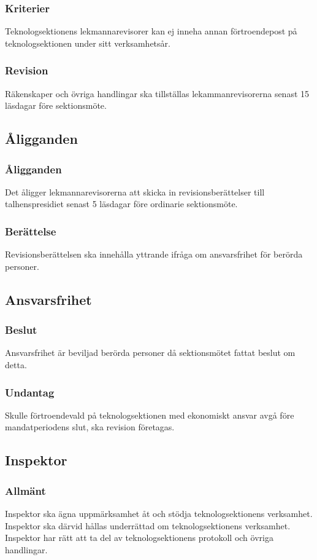 \documentclass[a4paper]{dtek}
\begin{document}
\subsubsection{Kriterier}
Teknologsektionens lekmannarevisorer kan ej inneha annan förtroendepost på teknologsektionen under sitt verksamhetsår.
\subsubsection{Revision}
Räkenskaper och övriga handlingar ska tillställas lekammanrevisorerna senast 15 läsdagar före sektionsmöte.
\subsection{Åligganden}
\subsubsection{Åligganden}
Det åligger lekmannarevisorerna att skicka in revisionsberättelser till talhenspresidiet senast 5 läsdagar före ordinarie sektionsmöte.
\subsubsection{Berättelse}
Revisionsberättelsen ska innehålla yttrande ifråga om ansvarsfrihet för berörda personer.
\subsection{Ansvarsfrihet}
\subsubsection{Beslut}
Ansvarsfrihet är beviljad berörda personer då sektionsmötet fattat beslut om detta.
\subsubsection{Undantag}
Skulle förtroendevald på teknologsektionen med ekonomiskt ansvar avgå före mandatperiodens slut, ska revision företagas.
\subsection{Inspektor}
\subsubsection{Allmänt}
Inspektor ska ägna uppmärksamhet åt och stödja teknologsektionens verksamhet. Inspektor ska därvid hållas underrättad om teknologsektionens verksamhet. Inspektor har rätt att ta del av teknologsektionens protokoll och övriga handlingar.
\end{document}
